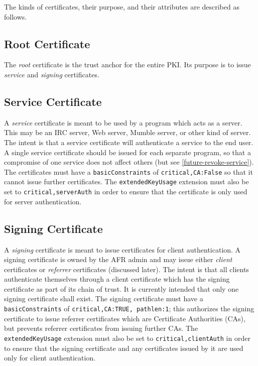 \documentclass{article}
\begin{document}
The kinds of certificates, their purpose, and their attributes are described as follows.

\subsection{Root Certificate}

The \emph{root} certificate is the trust anchor for the entire PKI.  Its purpose is to issue \emph{service} and \emph{signing} certificates.

\subsection{Service Certificate}
A \emph{service} certificate is meant to be used by a program which acts as a server.  This may be an IRC server, Web server, Mumble server, or other kind of server.  The intent is that a service certificate will authenticate a service to the end user.  A single service certificate should be issued for each separate program, so that a compromise of one service does not affect others (but see \ref{future-revoke-service}).  The certificates must have a \texttt{basicConstraints} of \texttt{critical,CA:False} so that it cannot issue further certificates.  The \texttt{extendedKeyUsage} extension must also be set to \texttt{critical,serverAuth} in order to ensure that the certificate is only used for server authentication.

\subsection{Signing Certificate}
A \emph{signing} certificate is meant to issue certificates for client authentication.  A signing certificate is owned by the AFR admin and may issue either \emph{client} certificates or \emph{referrer} certificates (discussed later).  The intent is that all clients authenticate themselves through a client certificate which has the signing certificate as part of its chain of trust.  It is currently intended that only one signing certificate shall exist.  The signing certificate must have a \texttt{basicConstraints} of \texttt{critical,CA:TRUE, pathlen:1}; this authorizes the signing certificate to issue referrer certificates which are Certificate Authorities (CAs), but prevents referrer certificates from issuing further CAs.  The \texttt{extendedKeyUsage} extension must also be set to \texttt{critical,clientAuth} in order to ensure that the signing certificate and any certificates issued by it are used only for client authentication.
\end{document}
